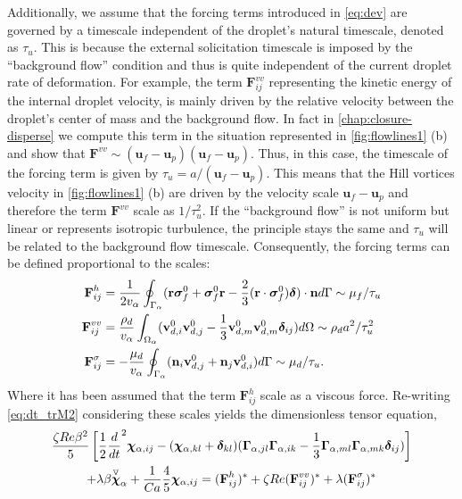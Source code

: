 Additionally, we assume that the forcing terms introduced in \ref{eq:dev} are governed by a timescale independent of the droplet's natural timescale, denoted as $\tau_u$. 
This is because the external solicitation timescale is imposed by the ``background flow'' condition and thus is quite independent of the current droplet rate of deformation. 
For example, the term $\textbf{F}_{ij}^{vv}$ representing the kinetic energy of the internal droplet velocity, is mainly driven by the relative velocity between the droplet's center of mass and the background flow. 
In fact in \ref{chap:closure-disperse} we compute this term in the situation represented in \ref{fig:flowlines1} (b) and show that $ \textbf{F}^{vv}\sim (\textbf{u}_f - \textbf{u}_p)(\textbf{u}_f - \textbf{u}_p)$. 
Thus, in this case, the timescale of the forcing term is given by $\tau_u = a /(\textbf{u}_f - \textbf{u}_p)$. 
This means that the Hill vortices velocity in \ref{fig:flowlines1} (b) are driven by the velocity scale $\textbf{u}_f - \textbf{u}_p$ and therefore the term $\textbf{F}^{vv}$ scale as $1/\tau_u^2$. 
If the ``background flow'' is not uniform but linear or represents isotropic turbulence, the principle stays the same and $\tau_u$ will be related to the background flow timescale. 
Consequently, the forcing terms can be defined proportional to the scales: 
\begin{align*}
    \textbf{F}_{ij}^h
    &= \frac{1}{2v_\alpha}\oint_{\Gamma_{\alpha}} (\textbf{r}\bm\sigma_f^0 + \bm\sigma_f^0\textbf{r} - \frac{2}{3}(\textbf{r}\cdot \bm\sigma_f^0) \bm\delta)\cdot \textbf{n} d\Gamma 
    \sim \mu_f  /\tau_u \\
    \textbf{F}_{ij}^{vv}
    &= \frac{\rho_d}{v_\alpha}
    \int_{\Omega_{\alpha}} (\textbf{v}_{d,i}^0\textbf{v}_{d,j}^0 - \frac{1}{3}\textbf{v}_{d,m}^0\textbf{v}_{d,m}^0 \bm\delta_{ij})  d\Omega
    \sim  \rho_d a^2  /\tau_u^2 \\
    \textbf{F}_{ij}^{\sigma}
    &= - \frac{\mu_d}{v_\alpha} \oint_{\Gamma_{\alpha}} (\textbf{n}_i \textbf{v}_{d,j}^0 + \textbf{n}_j \textbf{v}_{d,i}^0) d\Gamma
    \sim  \mu_d  /\tau_u. 
\end{align*}
Where it has been assumed that the term $\textbf{F}_{ij}^h$ scale as a viscous force. 
Re-writing \ref{eq:dt_trM2} considering these scales yields the dimensionless tensor equation, 
\begin{multline}
    \frac{\zeta Re \beta^2}{5}
    \left[
        \frac{1}{2}\ddt^2 \bm\chi_{\alpha,ij}
        -   (\bm\chi_{\alpha,kl} + \bm\delta_{kl})
        (\bm\Gamma_{\alpha,jl}\bm\Gamma_{\alpha,ik}  
        - \frac{1}{3}
        \bm\Gamma_{\alpha,ml}\bm\Gamma_{\alpha,mk}  
        \bm\delta_{ij}
        )
    \right]\\
    + \lambda \beta \overset{ \triangledown  }{\bm\chi}_\alpha
    + \frac{1}{Ca}
    \frac{4  }{5} \bm\chi_{\alpha,ij}
    = (\textbf{F}_{ij}^h )^*
    + \zeta Re (\textbf{F}_{ij}^{vv})^*
    + \lambda (\textbf{F}_{ij}^{\sigma})^* 
    \label{eq:dev_dim}
\end{multline}
